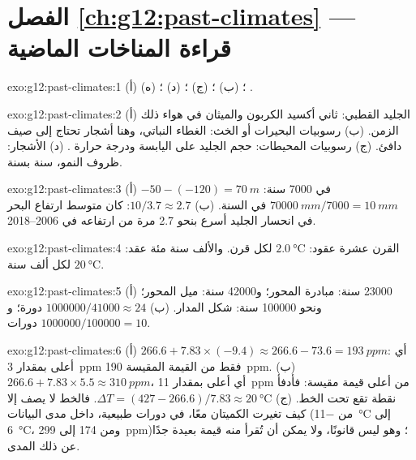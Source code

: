 \section*{الفصل \ref{ch:g12:past-climates} --- قراءة المناخات الماضية}

\begin{solution}{exo:g12:past-climates:1}
(أ) ؛ (ب) ؛ (ج) ؛ (د) ؛
(ه) .
\end{solution}

\begin{solution}{exo:g12:past-climates:2}
(أ) الجليد القطبي: ثاني أكسيد الكربون والميثان في هواء ذلك الزمن.
(ب) رسوبيات البحيرات أو الخث: الغطاء النباتي، وهنا أشجار تحتاج إلى صيف
دافئ. (ج) رسوبيات المحيطات: حجم الجليد على اليابسة ودرجة حرارة
. (د) الأشجار: ظروف النمو، سنة بسنة.
\end{solution}

\begin{solution}{exo:g12:past-climates:3}
(أ) $-50 - (-120) = \qty{70}{m}$ في \num{7000} سنة: $\qty{70000}{mm}/\num{7000}
= \qty{10}{mm}$ في السنة. (ب) $10/3.7 \approx 2.7$: كان متوسط ارتفاع البحر في
انحسار الجليد أسرع بنحو 2.7 مرة من ارتفاعه في 2006--2018.
\end{solution}

\begin{solution}{exo:g12:past-climates:4}
القرن عشرة عقود: $\qty{2.0}{\degreeCelsius}$ لكل قرن. والألف سنة
مئة عقد: $\qty{20}{\degreeCelsius}$ لكل ألف سنة.
\end{solution}

\begin{solution}{exo:g12:past-climates:5}
(أ) \num{23000} سنة: مبادرة المحور؛ و\num{42000} سنة: ميل
المحور؛ ونحو \num{100000} سنة: شكل المدار.
(ب) $\num{1000000}/\num{41000} \approx 24$ دورة؛ و$\num{1000000}/\num{100000}
= 10$ دورات.
\end{solution}

\begin{solution}{exo:g12:past-climates:6}
(أ) $266.6 + 7.83 \times (-9.4) \approx 266.6 - 73.6 = \qty{193}{ppm}$: أي
أعلى بمقدار \qty{3}{ppm} فقط من القيمة المقيسة \qty{190}{ppm}. (ب) $266.6 + 7.83 \times 5.5
\approx \qty{310}{ppm}$، أي أعلى بمقدار \qty{11}{ppm} من أعلى قيمة مقيسة: فأدفأ
نقطة تقع تحت الخط. (ج) $\Delta T = (427 - 266.6)/7.83 \approx
\qty{20}{\degreeCelsius}$. فالخط لا يصف إلا كيف تغيرت الكميتان
معًا، في دورات طبيعية، داخل مدى البيانات
(من \qty{-11}{\degreeCelsius} إلى \qty{+6}{\degreeCelsius}، ومن 174 إلى
\qty{299}{ppm})؛ وهو ليس قانونًا، ولا يمكن أن تُقرأ منه قيمة بعيدة
جدًا عن ذلك المدى.
\end{solution}

